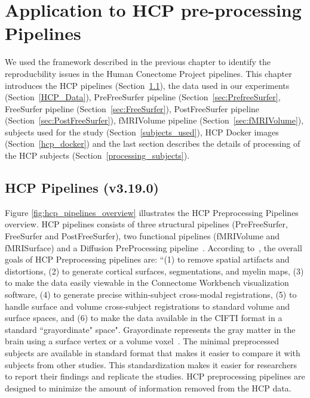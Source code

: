 \chapter{Application to HCP pre-processing Pipelines}\label{pipelines}
\setlength{\parskip}{1em}
\setlength{\parindent}{4em}
We used the framework described in the previous chapter to identify the reproducbility issues in the Human Conectome Project pipelines. This chapter introduces the HCP pipelines (Section~\ref{hcp_pipelines}), the data used in our experiments (Section~\ref{HCP_Data}), PreFreeSurfer pipeline (Section~\ref{sec:PrefreeSurfer}, FreeSurfer pipeline (Section~\ref{sec:FreeSurfer}), PostFreeSurfer pipeline (Section~\ref{sec:PostFreeSurfer}), fMRIVolume pipeline (Section~\ref{sec:fMRIVolume}), subjects used for the study (Section~\ref{subjects_used}), HCP Docker images (Section~\ref{hcp_docker}) and the last section describes the details of processing of the HCP subjects (Section~\ref{processing_subjects}).

\section{HCP Pipelines (v3.19.0)} \label{hcp_pipelines}
Figure \ref{fig:hcp_pipelines_overview} illustrates the HCP Preprocessing Pipelines overview. HCP pipelines consists of three structural pipelines (PreFreeSurfer, FreeSurfer and PostFreeSurfer), two functional pipelines (fMRIVolume and fMRISurface) and a Diffusion PreProcessing pipeline~\cite{Gla13}. According to~\cite{Gla13}, the overall goals of HCP Preprocessing pipelines are: ``(1) to remove spatial artifacts and distortions, (2) to generate cortical surfaces, segmentations, and myelin maps, (3) to make the data easily viewable in the Connectome Workbench visualization software, (4) to generate precise within-subject cross-modal registrations, (5) to handle surface and volume cross-subject registrations to standard volume and surface spaces, and (6) to make the data available in the CIFTI format in a standard ``grayordinate" space". Grayordinate represents the gray matter in the brain using a surface vertex or a volume voxel~\cite{Grayordinate}. The minimal preprocessed subjects are available in standard format that makes it easier to compare it with subjects from other studies. This standardization makes it easier for researchers to report their findings and replicate the studies. HCP preprocessing pipelines are designed to minimize the amount of information removed from the HCP data.

